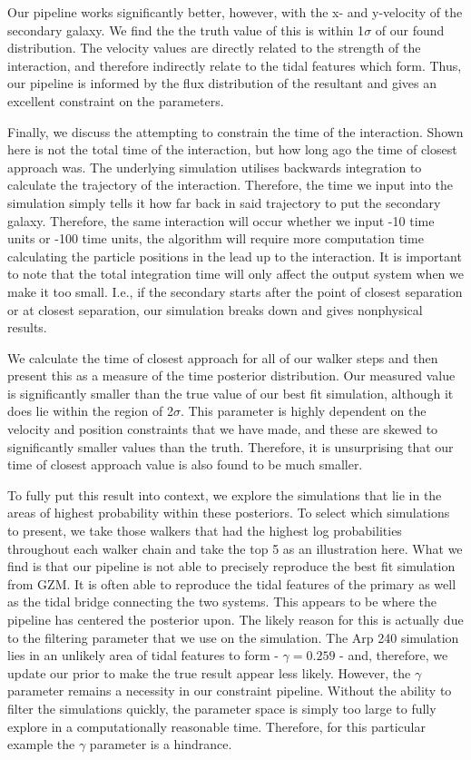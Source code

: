 Our pipeline works significantly better, however, with the x- and y-velocity of the secondary galaxy. We find the the truth value of this is within 1$\sigma$ of our found distribution. The velocity values are directly related to the strength of the interaction, and therefore indirectly relate to the tidal features which form. Thus, our pipeline is informed by the flux distribution of the resultant and gives an excellent constraint on the parameters.

Finally, we discuss the attempting to constrain the time of the interaction. Shown here is not the total time of the interaction, but how long ago the time of closest approach was. The underlying simulation utilises backwards integration to calculate the trajectory of the interaction. Therefore, the time we input into the simulation simply tells it how far back in said trajectory to put the secondary galaxy. Therefore, the same interaction will occur whether we input -10 time units or -100 time units, the algorithm will require more computation time calculating the particle positions in the lead up to the interaction. It is important to note that the total integration time will only affect the output system when we make it too small. I.e., if the secondary starts after the point of closest separation or at closest separation, our simulation breaks down and gives nonphysical results.

We calculate the time of closest approach for all of our walker steps and then present this as a measure of the time posterior distribution. Our measured value is significantly smaller than the true value of our best fit simulation, although it does lie within the region of 2$\sigma$. This parameter is highly dependent on the velocity and position constraints that we have made, and these are skewed to significantly smaller values than the truth. Therefore, it is unsurprising that our time of closest approach value is also found to be much smaller.

To fully put this result into context, we explore the simulations that lie in the areas of highest probability within these posteriors. To select which simulations to present, we take those walkers that had the highest log probabilities throughout each walker chain and take the top 5 as an illustration here. What we find is that our pipeline is not able to precisely reproduce the best fit simulation from GZM. It is often able to reproduce the tidal features of the primary as well as the tidal bridge connecting the two systems. This appears to be where the pipeline has centered the posterior upon. The likely reason for this is actually due to the filtering parameter that we use on the simulation. The Arp 240 simulation lies in an unlikely area of tidal features to form - $\gamma = 0.259$ - and, therefore, we update our prior to make the true result appear less likely. However, the $\gamma$ parameter remains a necessity in our constraint pipeline. Without the ability to filter the simulations quickly, the parameter space is simply too large to fully explore in a computationally reasonable time. Therefore, for this particular example the $\gamma$ parameter is a hindrance.


